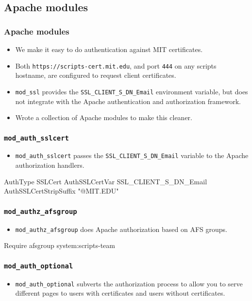 \subsection{Apache modules}

\begin{frame}[fragile]
  \frametitle{Apache modules}
  \begin{itemize}
  \item We make it easy to do authentication against MIT certificates.
  \item Both \texttt{https://scripts-cert.mit.edu}, and port
    \texttt{444} on any scripts hostname, are configured to request
    client certificates.
  \item \texttt{mod\_ssl} provides the
    \texttt{SSL\_CLIENT\_S\_DN\_Email} environment variable, but does
    not integrate with the Apache authentication and authorization
    framework.
  \item Wrote a collection of Apache modules to make this cleaner.
  \end{itemize}
\end{frame}

\begin{frame}[fragile]
  \frametitle{\texttt{mod\_auth\_sslcert}}
  \begin{itemize}
  \item \texttt{mod\_auth\_sslcert} passes the
    \texttt{SSL\_CLIENT\_S\_DN\_Email} variable to the Apache
    authorization handlers.
  \end{itemize}
\begin{semiverbatim}
AuthType SSLCert
AuthSSLCertVar SSL_CLIENT_S_DN_Email
AuthSSLCertStripSuffix "@MIT.EDU"
\end{semiverbatim}
\end{frame}

\begin{frame}[fragile]
  \frametitle{\texttt{mod\_authz\_afsgroup}}
  \begin{itemize}
  \item \texttt{mod\_authz\_afsgroup} does Apache authorization based
    on AFS groups.
  \end{itemize}
\begin{semiverbatim}
Require afsgroup system:scripts-team
\end{semiverbatim}
\end{frame}

\begin{frame}[fragile]
  \frametitle{\texttt{mod\_auth\_optional}}
  \begin{itemize}
  \item \texttt{mod\_auth\_optional} subverts the authorization
    process to allow you to serve different pages to users with
    certificates and users without certificates.
  \end{itemize}
\end{frame}
